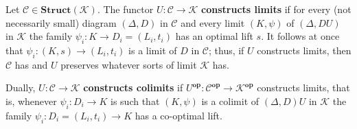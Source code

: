 Let $\mathcal{C} \in \mathbf{Struct}(\mathcal{K})$. The functor $U: \mathcal{C} \longrightarrow \mathcal{K}$ \textbf{constructs limits} if for every (not necessarily small) diagram $(\Delta, D)$ in $\mathcal{C}$ and every limit $(K, \psi)$ of $(\Delta, DU)$ in $\mathcal{K}$ the family $\psi_i: K \longrightarrow D_i = (L_i, t_i)$ has an optimal lift $s$. It follows at once that $\psi_i: (K, s) \longrightarrow (L_i, t_i)$ is a limit of $D$ in $\mathcal{C}$; thus, if $U$ constructs limits, then $\mathcal{C}$ has and $U$ preserves whatever sorts of limit $\mathcal{K}$ has.

Dually, $U: \mathcal{C} \longrightarrow \mathcal{K}$ \textbf{constructs colimits} if $U^{\mathbf{op}}: \mathcal{C}^{\mathbf{op}} \longrightarrow \mathcal{K}^{\mathbf{op}}$ constructs limits, that is, whenever $\psi_i: D_i \longrightarrow K$ is such that $(K, \psi)$ is a colimit of $(\Delta, D)U$ in $\mathcal{K}$ the family $\psi_i: D_i = (L_i, t_i) \longrightarrow K$ has a co-optimal lift.
